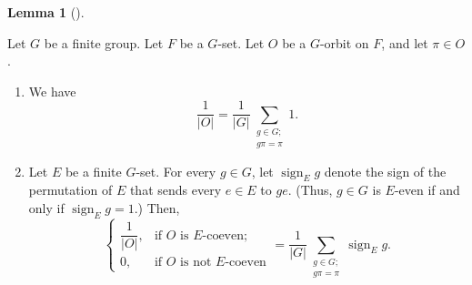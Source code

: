 \documentclass[numbers=enddot,12pt,final,onecolumn,notitlepage,abstracton]{scrartcl}
\theoremstyle{definition}
\newtheorem{lem}[theo]{Lemma}
\newenvironment{lemma}[1][]
{\begin{lem}[#1]\begin{leftbar}}
{\end{leftbar}\end{lem}}
\let\sumnonlimits\sum
\renewcommand{\sum}{\sumnonlimits\limits}
\newcommand{\sign}{\operatorname{sign}}
\begin{document}
\begin{lemma}
\label{lem.burnside.sums} Let $G$ be a finite group. Let $F$ be a
$G$-set. Let $O$ be a $G$-orbit on $F$, and let $\pi\in O$.

\begin{enumerate}
\item[(a)] We have
\begin{equation}
\dfrac{1}{\left\vert O\right\vert }=\dfrac{1}{\left\vert G\right\vert }%
\sum_{\substack{g\in G;\\g\pi=\pi}}1.\label{eq.lem.burnside.sums.a}%
\end{equation}


\item[(b)] Let $E$ be a finite $G$-set. For every $g\in G$, let
$\sign_E g$ denote the sign of the permutation of $E$ that
sends every $e\in E$ to $ge$. (Thus, $g\in G$ is $E$-even if and only if
$\sign_E g = 1$.) Then,
\begin{equation}
\begin{cases}
\dfrac{1}{\left\vert O\right\vert }, & \text{if }O\text{ is }E\text{-coeven}%
;\\
0, & \text{if }O\text{ is not }E\text{-coeven}%
\end{cases}
=
\dfrac{1}{\left\vert G\right\vert }
\sum_{\substack{g\in G;\\ g\pi=\pi}} \sign_E g .
\label{eq.lem.burnside.sums.b}
\end{equation}

\end{enumerate}
\end{lemma}
\end{document}
